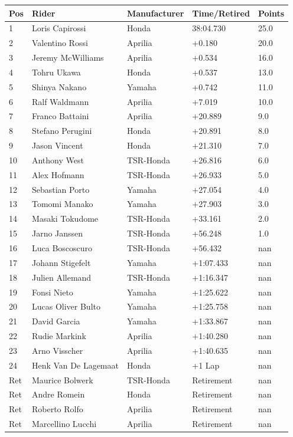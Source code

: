 \documentclass{article}
\begin{document}
\begin{tabular}{lllll}
\toprule
Pos & Rider & Manufacturer & Time/Retired & Points \\
\midrule
1 & Loris Capirossi & Honda & 38:04.730 & 25.0 \\
2 & Valentino Rossi & Aprilia & +0.180 & 20.0 \\
3 & Jeremy McWilliams & Aprilia & +0.534 & 16.0 \\
4 & Tohru Ukawa & Honda & +0.537 & 13.0 \\
5 & Shinya Nakano & Yamaha & +0.742 & 11.0 \\
6 & Ralf Waldmann & Aprilia & +7.019 & 10.0 \\
7 & Franco Battaini & Aprilia & +20.889 & 9.0 \\
8 & Stefano Perugini & Honda & +20.891 & 8.0 \\
9 & Jason Vincent & Honda & +21.310 & 7.0 \\
10 & Anthony West & TSR-Honda & +26.816 & 6.0 \\
11 & Alex Hofmann & TSR-Honda & +26.933 & 5.0 \\
12 & Sebastian Porto & Yamaha & +27.054 & 4.0 \\
13 & Tomomi Manako & Yamaha & +27.903 & 3.0 \\
14 & Masaki Tokudome & TSR-Honda & +33.161 & 2.0 \\
15 & Jarno Janssen & TSR-Honda & +56.248 & 1.0 \\
16 & Luca Boscoscuro & TSR-Honda & +56.432 & nan \\
17 & Johann Stigefelt & Yamaha & +1:07.433 & nan \\
18 & Julien Allemand & TSR-Honda & +1:16.347 & nan \\
19 & Fonsi Nieto & Yamaha & +1:25.622 & nan \\
20 & Lucas Oliver Bulto & Yamaha & +1:25.758 & nan \\
21 & David Garcia & Yamaha & +1:33.867 & nan \\
22 & Rudie Markink & Aprilia & +1:40.280 & nan \\
23 & Arno Visscher & Aprilia & +1:40.635 & nan \\
24 & Henk Van De Lagemaat & Honda & +1 Lap & nan \\
Ret & Maurice Bolwerk & TSR-Honda & Retirement & nan \\
Ret & Andre Romein & Honda & Retirement & nan \\
Ret & Roberto Rolfo & Aprilia & Retirement & nan \\
Ret & Marcellino Lucchi & Aprilia & Retirement & nan \\
\bottomrule
\end{tabular}
\end{document}
